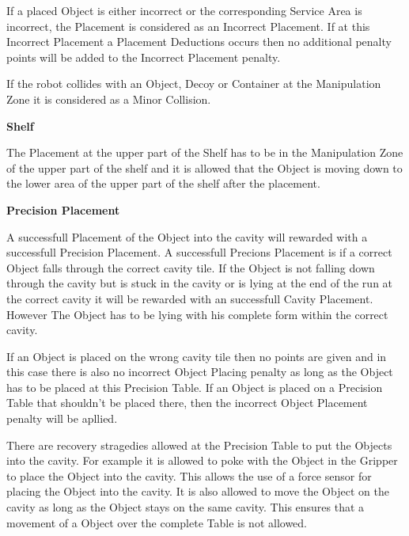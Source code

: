 If a placed Object is either incorrect or the corresponding Service Area is incorrect, the Placement is considered as an Incorrect Placement. If at this Incorrect Placement a Placement Deductions occurs then no additional penalty points will be added to the Incorrect Placement penalty.

If the robot collides with an Object, Decoy or Container at the Manipulation Zone it is considered as a Minor Collision.

\textbf{Shelf}

The Placement at the upper part of the Shelf has to be in the Manipulation Zone of the upper part of the shelf and it is allowed that the Object is moving down to the lower area of the upper part of the shelf after the placement. 


\textbf{Precision Placement}

A successfull Placement of the Object into the cavity will rewarded with a successfull Precision Placement. A successfull Precions Placement is if a  correct Object falls through the correct cavity tile. If the Object is not falling down through the cavity but is stuck in the cavity or is lying at the end of the run at the correct cavity it will be rewarded with an successfull Cavity Placement. However The Object has to be lying with his complete form within the correct cavity.

If an Object is placed on the wrong cavity tile then no points are given and in this case there is also no incorrect Object Placing penalty as long as the Object has to be placed at this Precision Table. If an Object is placed on a Precision Table that shouldn't be placed there, then the incorrect Object Placement penalty will be apllied. 

There are recovery stragedies allowed at the Precision Table to put the Objects into the cavity.
For example it is allowed to poke with the Object in the Gripper to place the Object into the cavity. This  allows the use of a force sensor for placing the Object into the cavity.
It is also allowed to move the Object on the cavity as long as the Object stays on the same cavity. This ensures that a movement of a Object over the complete Table is not allowed.

 


\newpage
%







